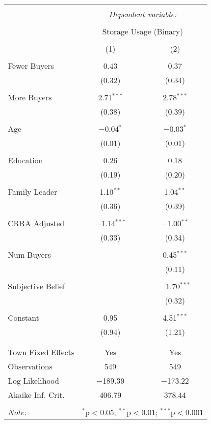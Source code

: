 
\begin{table}[!htbp] \centering 
  \caption{} 
  \label{} 
\begin{tabular}{@{\extracolsep{5pt}}lcc} 
\\[-1.8ex]\hline 
\hline \\[-1.8ex] 
 & \multicolumn{2}{c}{\textit{Dependent variable:}} \\ 
\cline{2-3} 
\\[-1.8ex] & \multicolumn{2}{c}{Storage Usage (Binary)} \\ 
\\[-1.8ex] & (1) & (2)\\ 
\hline \\[-1.8ex] 
 Fewer Buyers & 0.43 & 0.37 \\ 
  & (0.32) & (0.34) \\ 
  & & \\ 
 More Buyers & 2.71$^{***}$ & 2.78$^{***}$ \\ 
  & (0.38) & (0.39) \\ 
  & & \\ 
 Age & $-$0.04$^{*}$ & $-$0.03$^{*}$ \\ 
  & (0.01) & (0.01) \\ 
  & & \\ 
 Education & 0.26 & 0.18 \\ 
  & (0.19) & (0.20) \\ 
  & & \\ 
 Family Leader & 1.10$^{**}$ & 1.04$^{**}$ \\ 
  & (0.36) & (0.39) \\ 
  & & \\ 
 CRRA Adjusted & $-$1.14$^{***}$ & $-$1.00$^{**}$ \\ 
  & (0.33) & (0.34) \\ 
  & & \\ 
 Num Buyers &  & 0.45$^{***}$ \\ 
  &  & (0.11) \\ 
  & & \\ 
 Subjective Belief &  & $-$1.70$^{***}$ \\ 
  &  & (0.32) \\ 
  & & \\ 
 Constant & 0.95 & 4.51$^{***}$ \\ 
  & (0.94) & (1.21) \\ 
  & & \\ 
\hline \\[-1.8ex] 
Town Fixed Effects & Yes & Yes \\ 
Observations & 549 & 549 \\ 
Log Likelihood & $-$189.39 & $-$173.22 \\ 
Akaike Inf. Crit. & 406.79 & 378.44 \\ 
\hline 
\hline \\[-1.8ex] 
\textit{Note:}  & \multicolumn{2}{r}{$^{*}$p$<$0.05; $^{**}$p$<$0.01; $^{***}$p$<$0.001} \\ 
\end{tabular} 
\end{table} 
